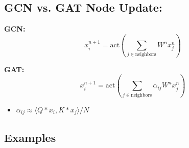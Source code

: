 \subsection{GCN vs. GAT Node Update:}
\begin{notes}
    \textbf{GCN:}
    \[
    x_i^{n+1} = \text{act} \left( \sum_{j \in \text{neighbors}} W^n x_j^n \right)
    \]

    \textbf{GAT:}
    \[
    x_i^{n+1} = \text{act} \left( \sum_{j \in \text{neighbors}} \alpha_{ij} W^n x_j^n \right)
    \]
    \begin{itemize}
        \item $\alpha_{ij} \approx \langle Q * x_i, K * x_j \rangle / N$
    \end{itemize}
\end{notes}

\subsection{Examples}

